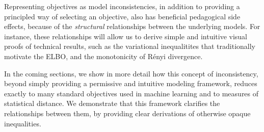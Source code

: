 \documentclass[twoside]{article}
\theoremstyle{plain}
\theoremstyle{definition}
\begin{document}
Representing objectives as model inconsistencies, in addition to providing a principled way of selecting an objective, also has beneficial pedagogical side effects, because of the \emph{structural} relationships between the underlying models.
For instance, these relationships will allow us to derive
simple and intuitive visual proofs of technical results,
such as the variational inequalitites that traditionally motivate the ELBO,
and the monotonicity of R\'enyi divergence.



In the coming sections, we show in more detail how this concept of inconsistency, beyond simply providing a permissive and intuitive modeling framework, reduces exactly to many standard objectives used in machine learning and to measures of statistical distance.
 We demonstrate that this framework clarifies the relationships between them, by providing clear derivations of otherwise opaque inequalities.
\end{document}
